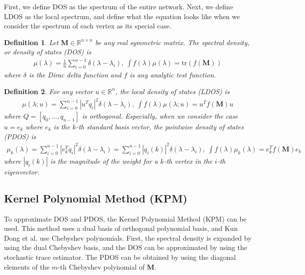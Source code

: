 \documentclass[senior,final,11pt]{iscs-thesis}
\newtheorem{definition}{Definition}
\begin{document}
First, we define DOS as the spectrum of the entire network. Next, we define LDOS as the local spectrum, and define what the equation looks like when we consider the spectrum of each vertex as its special case.
\begin{definition}
    Let ${\mathbf M} \in \mathbb{R}^{n\times n}$ be any real symmetric matrix. The spectral density, or density of states (DOS) is
    \begin{align}
        \mu(\lambda) = \frac{1}{n}\sum_{i=0}^{n-1} \delta(\lambda - \lambda_i), ~ \int f(\lambda)\mu(\lambda)= \mathrm{tr}(f({\mathbf M}))
    \end{align}
    where $\delta$ is the Dirac delta function and $f$ is any analytic test function.
\end{definition}
\begin{definition}
    For any vector $u \in \mathbb{R}^n$, the local density of states (LDOS) is
    \begin{align}
        \mu(\lambda ; u) = \sum_{i=0}^{n-1} |u^T q_i|^2 \delta(\lambda - \lambda_i), ~ \int f(\lambda) \mu(\lambda; u) = u^T f({\mathbf M}) u
    \end{align}
    where $Q=[q_0, ..., q_{n-1}]$ is orthogonal.
    Especially, when we consider the case $u=e_k$ where $e_k$ is the $k$-th standard basis vector, the pointwise density of states (PDOS) is
    \begin{align}
        \mu_k(\lambda) = \sum_{i=0}^{n-1} |e_k^T q_i|^2 \delta(\lambda - \lambda_i) = \sum_{i=0}^{n-1} |q_i(k)|^2 \delta(\lambda - \lambda_i), ~ \int f(\lambda) \mu_k(\lambda) = e_k^T f({\mathbf M}) e_k
    \end{align}
    where $|q_i(k)|$ is the magnitude of the weight for a $k$-th vertex in the $i$-th eigenvector.
\end{definition}

\subsection{Kernel Polynomial Method (KPM)}
To approximate DOS and PDOS, the Kernel Polynomial Method (KPM) \cite{weisse2006kernel} can be used. This method uses a dual basis of orthogonal polynomial basis, and Kun Dong et al.\cite{dong2019network} use Chebyshev polynomials. First, the spectral density is expanded by using the dual Chebyshev basis, and the DOS can be approximated by using the stochastic trace estimator. The PDOS can be obtained by using the diagonal elements of the $m$-th Chebyshev polynomial of ${\mathbf M}$.
\end{document}
